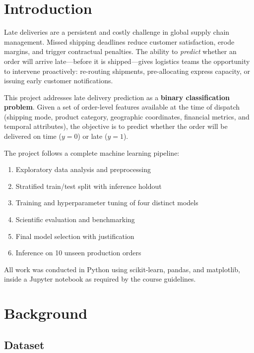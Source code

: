\documentclass[12pt,a4paper]{article}
\begin{document}
\section{Introduction}
\label{sec:intro}

Late deliveries are a persistent and costly challenge in global supply chain
management. Missed shipping deadlines reduce customer satisfaction, erode
margins, and trigger contractual penalties. The ability to \emph{predict}
whether an order will arrive late---before it is shipped---gives logistics
teams the opportunity to intervene proactively: re-routing shipments,
pre-allocating express capacity, or issuing early customer notifications.

This project addresses late delivery prediction as a \textbf{binary
classification problem}. Given a set of order-level features available at the
time of dispatch (shipping mode, product category, geographic coordinates,
financial metrics, and temporal attributes), the objective is to predict
whether the order will be delivered on time ($y=0$) or late ($y=1$).

The project follows a complete machine learning pipeline:
\begin{enumerate}[leftmargin=2em,itemsep=2pt]
  \item Exploratory data analysis and preprocessing
  \item Stratified train/test split with inference holdout
  \item Training and hyperparameter tuning of four distinct models
  \item Scientific evaluation and benchmarking
  \item Final model selection with justification
  \item Inference on 10 unseen production orders
\end{enumerate}

All work was conducted in Python using scikit-learn, pandas, and matplotlib,
inside a Jupyter notebook as required by the course guidelines.

\section{Background}
\label{sec:background}

\subsection{Dataset}
\end{document}
